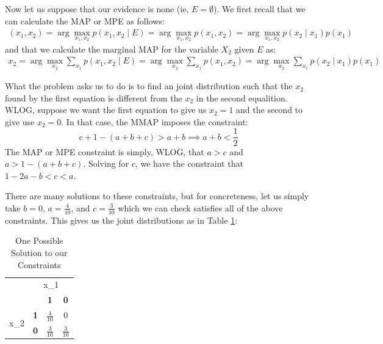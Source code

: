 \documentclass[12pt]{article}
\begin{document}
Now let us suppose that our evidence is none (ie, $E = \emptyset$). We first recall that we can calculate the MAP or MPE as follows:
\begin{align*}
(x_1, x_2) = \arg\max_{x_1,x_2} p(x_1, x_2 \mid E) = \arg\max_{x_1,x_2} p(x_1, x_2) = \arg\max_{x_1,x_2} p(x_2\mid x_1)p(x_1)
\end{align*}
and that we calculate the marginal MAP for the variable $X_2$ given $E$ as:
\begin{align*}
x_2 = \arg\max_{x_2} \sum_{x_1} p(x_1, x_2 \mid E) = \arg\max_{x_2} \sum_{x_1} p(x_1, x_2) = \arg\max_{x_2}\sum_{x_1} p(x_2\mid x_1)p(x_1)
\end{align*}

What the problem asks us to do is to find an joint distribution such that the $x_2$ found by the first equation is different from the $x_2$ in the second equalition. WLOG, suppose we want the first equation to give us $x_2 = 1$ and the second to give use $x_2 = 0$. In that case, the MMAP imposes the constraint:
$$
c + 1-(a+b+c) > a + b \implies a + b < \frac{1}{2}
$$
The MAP or MPE constraint is simply, WLOG, that $a > c$ and $a > 1 - (a + b + c)$. Solving for $c$, we have the constraint that $1 - 2a - b < c < a$.

There are many solutions to these constraints, but for concreteness, let us simply take $b = 0$, $a = \frac{4}{10}$, and $c = \frac{3}{10}$ which we can check satisfies all of the above constraints. This gives us the joint distributions as in Table \ref{table:constraint_joint_solution}:
\begin{table}[!h]
\centering
\begin{tabular}{|c|c|c|c|}
\hline
\multirow{2}{*}{}     & \multicolumn{3}{c|}{x\_1}            \\ \cline{2-4} 
                      &            & \textbf{1} & \textbf{0} \\ \hline
\multirow{2}{*}{x\_2} & \textbf{1} & $\frac{4}{10}$          & $0$          \\ \cline{2-4} 
                      & \textbf{0} & $\frac{3}{10}$          & $\frac{3}{10}$  \\ \hline
\end{tabular}
\caption{One Possible Solution to our Constraints}
\label{table:constraint_joint_solution}
\end{table}
\end{document}

